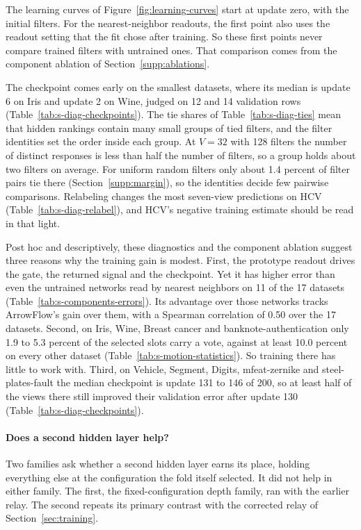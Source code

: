 The learning curves of Figure~\ref{fig:learning-curves} start at update zero, with the initial filters. For the nearest-neighbor readouts, the first point also uses the readout setting that the fit chose after training. So these first points never compare trained filters with untrained ones. That comparison comes from the component ablation of Section~\ref{supp:ablations}.

The checkpoint comes early on the smallest datasets, where its median is update 6 on Iris and update 2 on Wine, judged on 12 and 14 validation rows (Table~\ref{tab:s-diag-checkpoints}). The tie shares of Table~\ref{tab:s-diag-ties} mean that hidden rankings contain many small groups of tied filters, and the filter identities set the order inside each group. At $V=32$ with 128 filters the number of distinct responses is less than half the number of filters, so a group holds about two filters on average. For uniform random filters only about 1.4 percent of filter pairs tie there (Section~\ref{supp:margin}), so the identities decide few pairwise comparisons. Relabeling changes the most seven-view predictions on HCV (Table~\ref{tab:s-diag-relabel}), and HCV's negative training estimate should be read in that light.

\clearpage







Post hoc and descriptively, these diagnostics and the component ablation suggest three reasons why the training gain is modest. First, the prototype readout drives the gate, the returned signal and the checkpoint. Yet it has higher error than even the untrained networks read by nearest neighbors on 11 of the 17 datasets (Table~\ref{tab:s-components-errors}). Its advantage over those networks tracks ArrowFlow's gain over them, with a Spearman correlation of 0.50 over the 17 datasets. Second, on Iris, Wine, Breast cancer and banknote-authentication only 1.9 to 5.3 percent of the selected slots carry a vote, against at least 10.0 percent on every other dataset (Table~\ref{tab:s-motion-statistics}). So training there has little to work with. Third, on Vehicle, Segment, Digits, mfeat-zernike and steel-plates-fault the median checkpoint is update 131 to 146 of 200, so at least half of the views there still improved their validation error after update 130 (Table~\ref{tab:s-diag-checkpoints}).

\paragraph{Does a second hidden layer help?} Two families ask whether a second hidden layer earns its place, holding everything else at the configuration the fold itself selected. It did not help in either family. The first, the fixed-configuration depth family, ran with the earlier relay. The second repeats its primary contrast with the corrected relay of Section~\ref{sec:training}.

